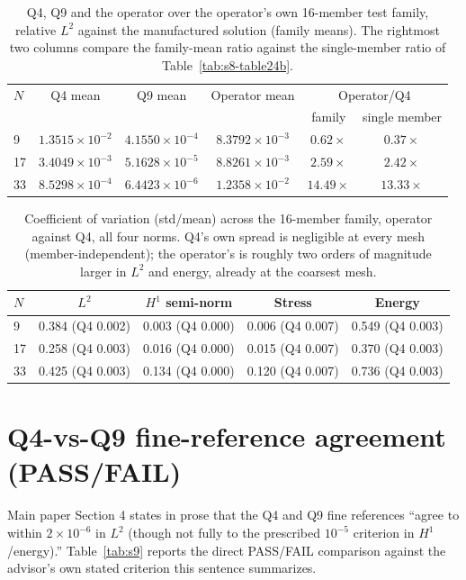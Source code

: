 \documentclass[11pt]{article}
\begin{document}
\begin{table}[h]
\centering
\caption{Q4, Q9 and the operator over the operator's own 16-member test
  family, relative $L^2$ against the manufactured solution (family
  means). The rightmost two columns compare the family-mean ratio
  against the single-member ratio of Table~\ref{tab:s8-table24b}.}
\label{tab:s8-table24c}
\footnotesize
\begin{tabular}{lccccc}
\toprule
$N$ & Q4 mean & Q9 mean & Operator mean & \multicolumn{2}{c}{Operator/Q4} \\
 & & & & family & single member \\
\midrule
9  & $1.3515\times10^{-2}$ & $4.1550\times10^{-4}$ & $8.3792\times10^{-3}$ & $0.62\times$  & $0.37\times$ \\
17 & $3.4049\times10^{-3}$ & $5.1628\times10^{-5}$ & $8.8261\times10^{-3}$ & $2.59\times$  & $2.42\times$ \\
33 & $8.5298\times10^{-4}$ & $6.4423\times10^{-6}$ & $1.2358\times10^{-2}$ & $14.49\times$ & $13.33\times$ \\
\bottomrule
\end{tabular}
\end{table}

\begin{table}[h]
\centering
\caption{Coefficient of variation (std/mean) across the 16-member family,
  operator against Q4, all four norms. Q4's own spread is negligible at
  every mesh (member-independent); the operator's is roughly two orders
  of magnitude larger in $L^2$ and energy, already at the coarsest mesh.}
\label{tab:s8-table24e}
\small
\begin{tabular}{lcccc}
\toprule
$N$ & $L^2$ & $H^1$ semi-norm & Stress & Energy \\
\midrule
9  & 0.384 (Q4 0.002) & 0.003 (Q4 0.000) & 0.006 (Q4 0.007) & 0.549 (Q4 0.003) \\
17 & 0.258 (Q4 0.003) & 0.016 (Q4 0.000) & 0.015 (Q4 0.007) & 0.370 (Q4 0.003) \\
33 & 0.425 (Q4 0.003) & 0.134 (Q4 0.000) & 0.120 (Q4 0.007) & 0.736 (Q4 0.003) \\
\bottomrule
\end{tabular}
\end{table}

\FloatBarrier
\section{Q4-vs-Q9 fine-reference agreement (PASS/FAIL)}
\label{sec:s9}
Main paper Section 4 states in prose that the Q4 and Q9 fine references
``agree to within $2\times10^{-6}$ in $L^2$ (though not fully to the
prescribed $10^{-5}$ criterion in $H^1$/energy).'' Table~\ref{tab:s9}
reports the direct PASS/FAIL comparison against the advisor's own stated
criterion this sentence summarizes.
\end{document}
